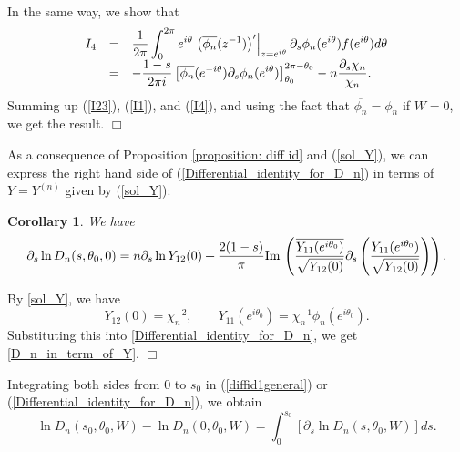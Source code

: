 \documentclass[11pt,fleqn]{article}
\numberwithin{equation}{section}
\def\Im{{\rm Im \,}}
\newtheorem{corollary}[theorem]{Corollary}
\newenvironment{proof}%
    {\rm \trivlist \item[\hskip \labelsep{\bf Proof. }]}%
    {\hspace*{\fill}$\Box$\endtrivlist}
\begin{document}
\begin{proof}
\begin{eqnarray}
\end{eqnarray}
In the same way, we show that
\begin{eqnarray}
\begin{array}{r c l}
\displaystyle I_{4} & = & \displaystyle  \frac{1}{2\pi} \int_{0}^{2\pi} e^{i\theta} \left. \left( \overline{\phi_{n}}(z^{-1}) \right)^{\prime} \right|_{z=e^{i\theta}} \partial_{s} \phi_{n}(e^{i\theta}) f(e^{i\theta})d\theta \\
& = &  \displaystyle -\frac{1-s}{2\pi i} \left[ \overline{\phi_{n}}(e^{-i\theta}) \partial_{s} \phi_{n}(e^{i\theta}) \right]_{\theta_{0}}^{2\pi -\theta_{0}} - n \frac{\partial_s \chi_{n}}{\chi_{n}}.\label{I4}
\end{array}
\end{eqnarray}
Summing up (\ref{I23}), (\ref{I1}), and (\ref{I4}), and using the fact that $\overline{\phi_{n}} =  \phi_{n}$ if $W=0$, we get the result.
\end{proof}




As a consequence of Proposition \ref{proposition: diff id} and (\ref{sol_Y}), we can express the right hand side of (\ref{Differential_identity_for_D_n}) in terms of $Y=Y^{(n)}$ given by (\ref{sol_Y}):

\begin{corollary}\label{cor}We have
\begin{equation} \label{D_n_in_term_of_Y}
\partial_{s} \ln D_{n}(s,\theta_{0},0) = n \partial_{s}\ln Y_{12}(0) + \frac{2(1-s)}{\pi} \Im \left( \frac{\overline{Y_{11}(e^{i\theta_{0}})}}{\sqrt{Y_{12}(0)}} \partial_{s} \left( \frac{Y_{11}(e^{i\theta_{0}})}{\sqrt{Y_{12}(0)}} \right) \right).
\end{equation}
\end{corollary}
\begin{proof}
By \eqref{sol_Y}, we have
\begin{equation*}
Y_{12}(0) = \chi_{n}^{-2},\qquad Y_{11}(e^{i\theta_{0}}) = \chi_{n}^{-1}\phi_{n}(e^{i\theta_{0}}).
\end{equation*}
Substituting this into \eqref{Differential_identity_for_D_n}, we get \eqref{D_n_in_term_of_Y}.
\end{proof}

Integrating both sides from $0$ to $s_0$ in (\ref{diffid1general}) or (\ref{Differential_identity_for_D_n}), we obtain
\begin{equation}\label{integration_diff_identity}
\ln D_n(s_0,\theta_0,W) - \ln D_n(0,\theta_0,W) = \int_{0}^{s_0} \left[ \partial_s \ln D_n (s,\theta_0,W)\right]ds.
\end{equation}
\end{document}
